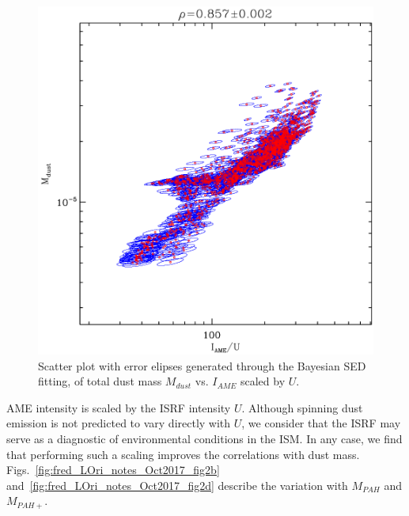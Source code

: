                 \begin{figure}
                 \includegraphics[width=\textwidth/2]{../Plots/ch_lori/fred_LOri_notes_Oct2017_fig2a.pdf}
                 \centering
                 \caption{Scatter plot with error elipses generated through the Bayesian SED fitting, of total dust mass $M_{dust}$ vs. $I_{AME}$ scaled by $U$.}
                 \label{fig:fred_LOri_notes_Oct2017_fig2a}
               \end{figure}
           AME intensity is scaled by the ISRF intensity $U$. Although spinning dust emission is not predicted to vary directly with $U$, we consider that the ISRF may serve as a diagnostic of environmental conditions in the ISM. In any case, we find that performing such a scaling improves the correlations with dust mass.   Figs.~\ref{fig:fred_LOri_notes_Oct2017_fig2b} and~\ref{fig:fred_LOri_notes_Oct2017_fig2d} describe the variation with $M_{PAH}$ and $M_{PAH+}$.
